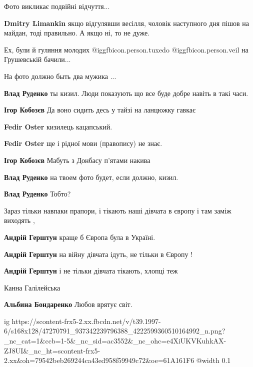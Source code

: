  
 
 
 
 

Фото викликає подвійні відчуття...

\textbf{Dmitry Limankin} якщо відгулявши весілля, чоловік наступного дня пішов на майдан, тоді правильно. А якщо ні, то не дуже.

Ех, були й гуляння молодих  @igg{fbicon.person.tuxedo}  @igg{fbicon.person.veil} на Грушевській бачили...

На фото должно быть два мужика ...

\begin{itemize} %
\textbf{Влад Руденко} ты кизил. Люди показують що все буде добре навіть в такі часи.

\textbf{Ігор Кобозєв} Да воно сидить десь у тайзі на ланцюжку гавкає

\textbf{Fedir Oster} кизилець кацапський.

\textbf{Fedir Oster} ще і рідної мови (правопису) не знає.

\textbf{Ігор Кобозєв} Мабуть з Донбасу п'ятами накива

\textbf{Влад Руденко} на твоем фото будет, если должно, кизил.

\textbf{Влад Руденко} Тобто?

\end{itemize} %


Зараз тільки навпаки прапори, і тікають наші дівчата в європу і там заміж
виходять ,

\begin{itemize} %
\textbf{Андрій Герштун} краще б Європа була в Україні.

\textbf{Андрій Герштун} на війну дівчата ідуть, не тільки в Європу !

\textbf{Андрій Герштун} і не тільки дівчата тікають, хлопці теж
\end{itemize} %

Канна Галілейська

\textbf{Альбина Бондаренко} Любов врятує світ.


\ifcmt
  ig https://scontent-frx5-2.xx.fbcdn.net/v/t39.1997-6/s168x128/47270791_937342239796388_4222599360510164992_n.png?_nc_cat=1&ccb=1-5&_nc_sid=ac3552&_nc_ohc=e4XiUKVKuhkAX-ZJ8UI&_nc_ht=scontent-frx5-2.xx&oh=79542beb269244ca43ed958f59949c72&oe=61A161F6
  @width 0.1
\fi

